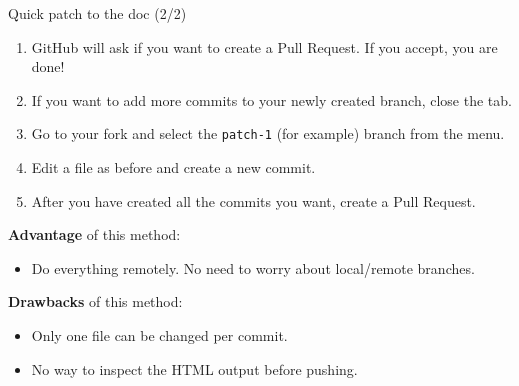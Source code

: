 \documentclass[8pt, handout]{beamer}
\begin{document}
\begin{frame}{Quick patch to the doc (2/2)}
\begin{enumerate}
    \setcounter{enumi}{\value{enumindex}}
    \item GitHub will ask if you want to create a \alert{Pull Request}. If you accept, you are done!
    \item If you want to \alert{add more commits} to your newly created branch, close the tab.
    \item Go to \alert{your fork} and select the \alert{\texttt{patch-1}} (for example) branch from the menu.
    \item \alert{Edit} a file as before and create a \alert{new commit}.
    \item After you have created all the commits you want, create a \alert{Pull Request}.
\end{enumerate}

\textbf{Advantage} of this method:
\begin{itemize}
    \item Do everything \alert{remotely}. No need to worry about local/remote branches.
\end{itemize}

\textbf{Drawbacks} of this method:
\begin{itemize}
    \item Only \alert{one file} can be changed \alert{per commit}.
    \item \alert{No way to inspect} the HTML output before pushing.
\end{itemize}
\end{frame}
\end{document}
